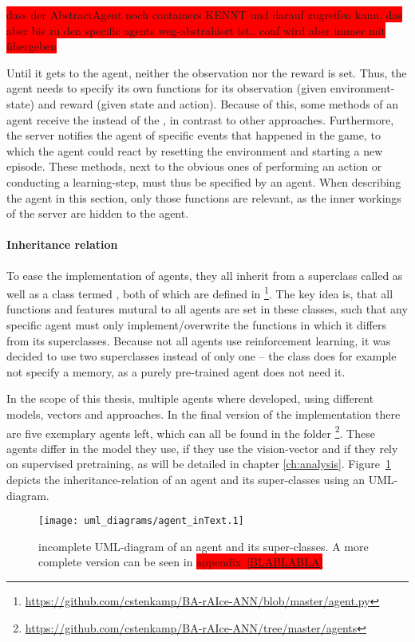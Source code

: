 \colorbox{red}{dass der AbstractAgent noch containers KENNT und darauf zugreifen kann, das aber bis zu den specific agents weg-abstrahiert ist.. conf wird aber immer mit übergeben}

Until it gets to the agent, neither the observation nor the reward is set. Thus, the agent needs to specify its own functions for its observation (given environment-state) and reward (given state and action). Because of this, some methods of an agent receive the  instead of the , in contrast to other approaches. Furthermore, the server notifies the agent of specific events that happened in the game, to which the agent could react by resetting the environment and starting a new episode. These methods, next to the obvious ones of performing an action or conducting a learning-step, must thus be specified by an agent. When describing the agent in this section, only those functions are relevant, as the inner workings of the server are hidden to the agent.

\paragraph{Inheritance relation}

To ease the implementation of agents, they all inherit from a superclass called  as well as a class termed , both of which are defined in \footnote{\url{https://github.com/cstenkamp/BA-rAIce-ANN/blob/master/agent.py}}. The key idea is, that all functions and features mutural to all agents are set in these classes, such that any specific agent must only implement/overwrite the functions in which it differs from its superclasses. Because not all agents use reinforcement learning, it was decided to use two superclasses instead of only one -- the class  does for example not specify a memory, as a purely pre-trained agent does not need it.

In the scope of this thesis, multiple agents where developed, using different models, vectors and approaches. In the final version of the implementation there are five exemplary agents left, which can all be found in the folder \footnote{\url{https://github.com/cstenkamp/BA-rAIce-ANN/tree/master/agents}}. These agents differ in the model they use, if they use the vision-vector and if they rely on supervised pretraining, as will be detailed in chapter \ref{ch:analysis}. %
Figure~\ref{fig:agentMINI} depicts the inheritance-relation of an agent and its super-classes using an UML-diagram.
\begin{figure}[h]
	\centering 
	\texttt{[image: uml\_diagrams/agent\_inText.1]}  
	\caption[UML-diagram of an agent and its super-classes]{incomplete UML-diagram of an agent and its super-classes. A more complete version can be seen in \colorbox{red}{appendix~\ref{BLABLABLA}}}
	\label{fig:agentMINI}
\end{figure}

